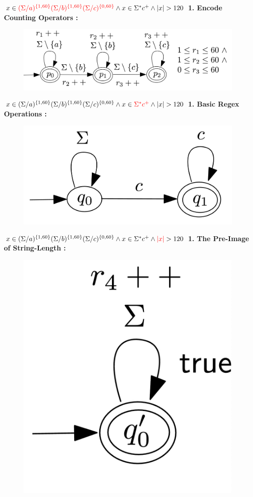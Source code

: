 \documentclass[landscape]{beamer}
\begin{document}
\begin{frame}{$ x\in \textcolor{red}{(\Sigma / a)^{\{1,60\}}(\Sigma / b)^{\{1,60\}}(\Sigma / c)^{\{0,60\}}} \wedge x\in \Sigma^*c^+ \wedge |x| > 120$}
  \textbf{1. Encode Counting Operators : }
  \begin{figure}
    \includegraphics[width=\linewidth]{overview_regex1.jpg}
  \end{figure}
\end{frame}
\begin{frame}{$ x\in (\Sigma / a)^{\{1,60\}}(\Sigma / b)^{\{1,60\}}(\Sigma / c)^{\{0,60\}} \wedge x\in \textcolor{red}{\Sigma^*c^+} \wedge |x| > 120$}
  \textbf{1. Basic Regex Operations : }
  \begin{figure}
    \includegraphics[width=.5\linewidth]{overview_regex2.jpg}
  \end{figure}
\end{frame}
\begin{frame}{$ x\in (\Sigma / a)^{\{1,60\}}(\Sigma / b)^{\{1,60\}}(\Sigma / c)^{\{0,60\}} \wedge x\in \Sigma^*c^+ \wedge \textcolor{red}{|x|} > 120$}
  \textbf{1. The Pre-Image of String-Length :}
  \begin{figure}
    \includegraphics[width=.25\linewidth]{overview_length_pre.jpg}
  \end{figure}
\end{frame}
\end{document}
